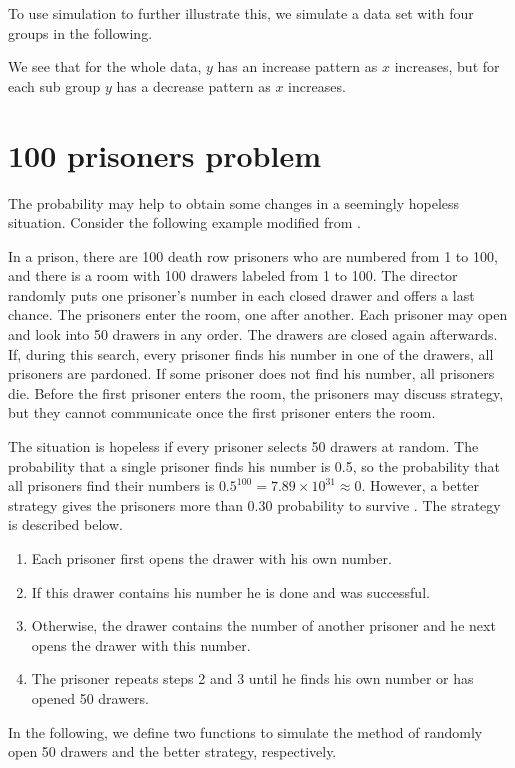 To use simulation to further illustrate this, we simulate a data set
with four groups in the following.



We see that for the whole data, $y$ has an increase pattern as $x$
increases, but for each sub group $y$ has a decrease pattern as $x$
increases.

\hypertarget{prisoners-problem}{%
\section{100 prisoners problem}\label{prisoners-problem}}

The probability may help to obtain some changes in a seemingly
hopeless situation. Consider the following example modified from
\cite{flajolet2009analytic}.

In a prison, there are 100 death row prisoners who are numbered from 1
to 100, and there is a room with 100 drawers labeled from 1 to
100. The director randomly puts one prisoner's number in each closed
drawer and offers a last chance. The prisoners enter the room, one
after another. Each prisoner may open and look into 50 drawers in any
order. The drawers are closed again afterwards. If, during this
search, every prisoner finds his number in one of the drawers, all
prisoners are pardoned. If some prisoner does not find his number, all
prisoners die. Before the first prisoner enters the room, the
prisoners may discuss strategy, but they cannot communicate once the
first prisoner enters the room.

The situation is hopeless if every prisoner selects 50 drawers at
random. The probability that a single prisoner finds his number is
0.5, so the probability that all prisoners find their numbers is
$0.5^{100} = 7.89\times10^{31}\approx0$. However, a better strategy
gives the prisoners more than 0.30 probability to survive
\citep{stanley2013algebraic}. The strategy is described below.

\begin{enumerate}
\item Each prisoner first opens the drawer with his own number.
\item If this drawer contains his number he is done and was
  successful.
\item Otherwise, the drawer contains the number of another prisoner
  and he next opens the drawer with this number.
\item The prisoner repeats steps 2 and 3 until he finds his own number
  or has opened 50 drawers.
\end{enumerate}

In the following, we define two functions to simulate the method of randomly open 50 drawers and the better strategy, respectively. 



